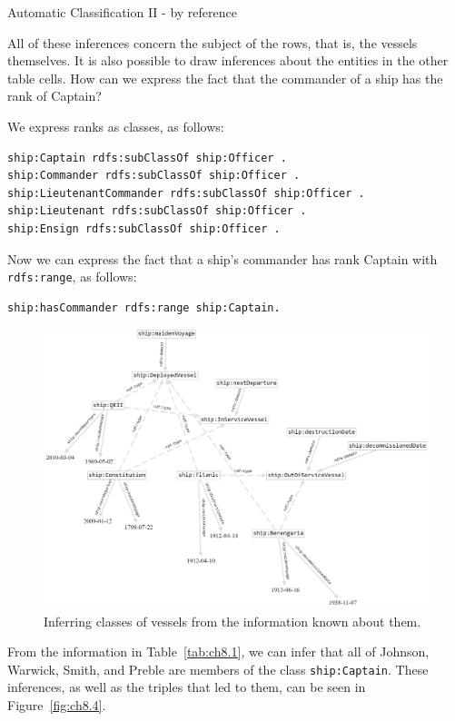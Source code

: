 \begin{challenge}{Automatic Classification II - by reference }

All of these inferences concern the subject of the rows, that is, the
vessels themselves. It is also possible to draw inferences about the
entities in the other table cells.
How can we express the fact that the commander of a ship has the rank of
Captain?

\solution

We express ranks as classes, as follows:

\begin{lstlisting}
ship:Captain rdfs:subClassOf ship:Officer .
ship:Commander rdfs:subClassOf ship:Officer .
ship:LieutenantCommander rdfs:subClassOf ship:Officer .
ship:Lieutenant rdfs:subClassOf ship:Officer .
ship:Ensign rdfs:subClassOf ship:Officer .
\end{lstlisting}

Now we can express the fact that a ship's commander has rank Captain
with \texttt{rdfs:range}, as follows:

\begin{lstlisting}
ship:hasCommander rdfs:range ship:Captain.
\end{lstlisting}

\begin{figure}
\centering
\includegraphics[width=5in]{SWWOv3/media/ch8/figure8-3.png}
\caption{Inferring classes of vessels from the information known about them.}
\label{fig:ch8.3}
\end{figure}


From the information in Table~\ref{tab:ch8.1}, we can infer that all of Johnson,
Warwick, Smith, and Preble are members of the class \texttt{ship:Captain}. These
inferences, as well as the triples that led to them, can be seen in
Figure~\ref{fig:ch8.4}.


\end{challenge}
